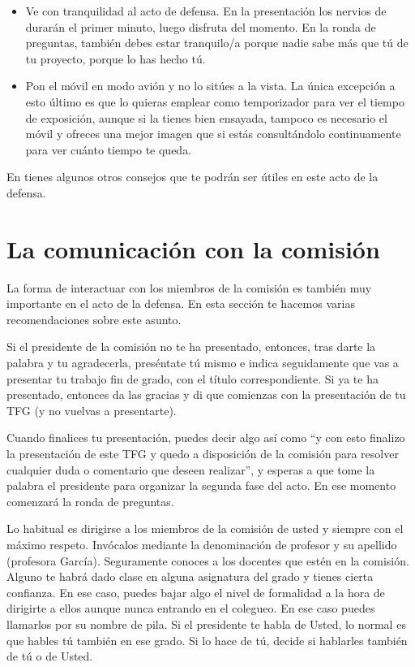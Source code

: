 \begin{itemize}
    \item Ve con tranquilidad al acto de defensa. En la presentación los nervios de durarán el primer minuto, luego disfruta del momento. En la ronda de preguntas, también debes estar tranquilo/a porque nadie sabe más que tú de tu proyecto, porque lo has hecho tú.

    \item Pon el móvil en modo avión y no lo sitúes a la vista. La única excepción a esto último es que lo quieras emplear como temporizador para ver el tiempo de exposición, aunque si la tienes bien ensayada, tampoco es necesario el móvil y ofreces una mejor imagen que si estás consultándolo continuamente para ver cuánto tiempo te queda.
\end{itemize}

En \cite{vallejo2009defensa} tienes algunos otros consejos que te podrán ser útiles en este acto de la defensa.

\section{La comunicación con la comisión}

La forma de interactuar con los miembros de la comisión es también muy importante en el acto de la defensa. En esta sección te hacemos varias recomendaciones sobre este asunto.

Si el presidente de la comisión no te ha presentado, entonces, tras darte la palabra y tu agradecerla, preséntate tú mismo e indica seguidamente que vas a presentar tu trabajo fin de grado, con el título correspondiente. Si ya te ha presentado, entonces da las gracias y di que comienzas con la presentación de tu TFG (y no vuelvas a presentarte). 

Cuando finalices tu presentación, puedes decir algo así como ``y con esto finalizo la presentación de este TFG y quedo a disposición de la comisión para resolver cualquier duda o comentario que deseen realizar'', y esperas a que tome la palabra el presidente para organizar la segunda fase del acto. En ese momento comenzará la ronda de preguntas. 

Lo habitual es dirigirse a los miembros de la comisión de usted y siempre con el máximo respeto. Invócalos mediante la denominación de profesor y su apellido (profesora García). Seguramente conoces a los docentes que estén en la comisión. Alguno te habrá dado clase en alguna asignatura del grado y tienes cierta confianza. En ese caso, puedes bajar algo el nivel de formalidad a la hora de dirigirte a ellos aunque nunca entrando en el colegueo. En ese caso puedes llamarlos por su nombre de pila. Si el presidente te habla de Usted, lo normal es que hables tú también en ese grado. Si lo hace de tú, decide si hablarles también de tú o de Usted. 

